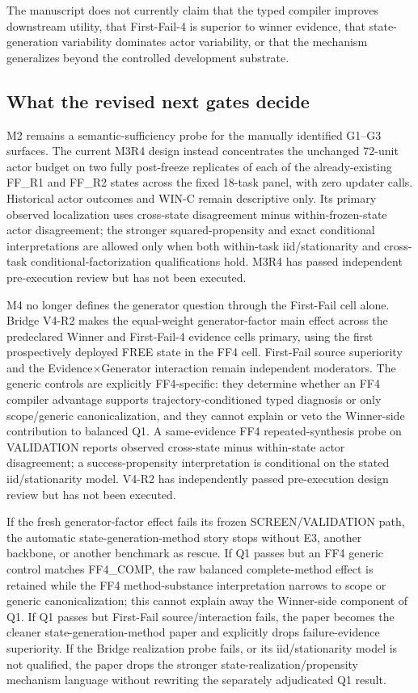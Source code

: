 The manuscript does not currently claim that the typed compiler improves downstream utility, that First-Fail-4 is superior to winner evidence, that state-generation variability dominates actor variability, or that the mechanism generalizes beyond the controlled development substrate.

\subsection{What the revised next gates decide}
M2 remains a semantic-sufficiency probe for the manually identified G1--G3 surfaces. The current M3R4 design instead concentrates the unchanged 72-unit actor budget on two fully post-freeze replicates of each of the already-existing FF\_R1 and FF\_R2 states across the fixed 18-task panel, with zero updater calls. Historical actor outcomes and WIN-C remain descriptive only. Its primary observed localization uses cross-state disagreement minus within-frozen-state actor disagreement; the stronger squared-propensity and exact conditional interpretations are allowed only when both within-task iid/stationarity and cross-task conditional-factorization qualifications hold. M3R4 has passed independent pre-execution review but has not been executed.

M4 no longer defines the generator question through the First-Fail cell alone. Bridge V4-R2 makes the equal-weight generator-factor main effect across the predeclared Winner and First-Fail-4 evidence cells primary, using the first prospectively deployed FREE state in the FF4 cell. First-Fail source superiority and the Evidence$\times$Generator interaction remain independent moderators. The generic controls are explicitly FF4-specific: they determine whether an FF4 compiler advantage supports trajectory-conditioned typed diagnosis or only scope/generic canonicalization, and they cannot explain or veto the Winner-side contribution to balanced Q1. A same-evidence FF4 repeated-synthesis probe on VALIDATION reports observed cross-state minus within-state actor disagreement; a success-propensity interpretation is conditional on the stated iid/stationarity model. V4-R2 has independently passed pre-execution design review but has not been executed.

If the fresh generator-factor effect fails its frozen SCREEN/VALIDATION path, the automatic state-generation-method story stops without E3, another backbone, or another benchmark as rescue. If Q1 passes but an FF4 generic control matches FF4\_COMP, the raw balanced complete-method effect is retained while the FF4 method-substance interpretation narrows to scope or generic canonicalization; this cannot explain away the Winner-side component of Q1. If Q1 passes but First-Fail source/interaction fails, the paper becomes the cleaner state-generation-method paper and explicitly drops failure-evidence superiority. If the Bridge realization probe fails, or its iid/stationarity model is not qualified, the paper drops the stronger state-realization/propensity mechanism language without rewriting the separately adjudicated Q1 result.

